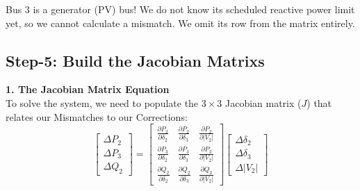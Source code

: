 \documentclass[11pt]{article}
\begin{document}
\begin{conceptbox}
Bus 3 is a generator (PV) bus! We do not know its scheduled reactive power limit yet, so we cannot calculate a mismatch. We omit its row from the matrix entirely.
\end{conceptbox}

\subsection*{Step-5: Build the Jacobian Matrixs}
\begin{stepbox}

\textbf{1. The Jacobian Matrix Equation}\\
To solve the system, we need to populate the $3 \times 3$ Jacobian matrix ($J$) that relates our Mismatches to our Corrections:
\begin{equation*}
    \begin{bmatrix} \Delta P_2 \\ \Delta P_3 \\ \Delta Q_2 \end{bmatrix} = 
    \begin{bmatrix} 
    \frac{\partial P_2}{\partial \delta_2} & \frac{\partial P_2}{\partial \delta_3} & \frac{\partial P_2}{\partial |V_2|} \\[0.3cm]
    \frac{\partial P_3}{\partial \delta_2} & \frac{\partial P_3}{\partial \delta_3} & \frac{\partial P_3}{\partial |V_2|} \\[0.3cm]
    \frac{\partial Q_2}{\partial \delta_2} & \frac{\partial Q_2}{\partial \delta_3} & \frac{\partial Q_2}{\partial |V_2|} 
    \end{bmatrix}
    \begin{bmatrix} \Delta \delta_2 \\ \Delta \delta_3 \\ \Delta |V_2| \end{bmatrix}
\end{equation*}


\end{stepbox}
\end{document}
